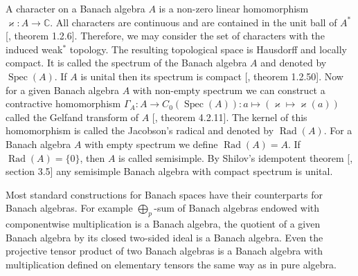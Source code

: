 A character on a Banach algebra $A$ is a non-zero linear homomorphism
$\varkappa:A\to\mathbb{C}$. All characters are continuous and are contained in
the unit ball of $A^*$  [\cite{HelBanLocConvAlg}, theorem 1.2.6]. Therefore, we
may consider the set of characters with the induced weak$^*$ topology. The
resulting topological space is Hausdorff and locally compact. It is called the
spectrum of the Banach algebra $A$ and denoted by $\operatorname{Spec}(A)$. If $A$
is unital then its spectrum is compact [\cite{HelBanLocConvAlg}, theorem
1.2.50]. Now for a given Banach algebra $A$ with non-empty spectrum we can
construct a contractive homomorphism $\Gamma_A:A\to
C_0(\operatorname{Spec}(A)):a\mapsto(\varkappa\mapsto \varkappa(a))$ called the
Gelfand transform of $A$ [\cite{HelBanLocConvAlg}, theorem 4.2.11]. The kernel
of this homomorphism is called the Jacobson's radical and denoted by
$\operatorname{Rad}(A)$. For a Banach algebra $A$ with empty spectrum we define
$\operatorname{Rad}(A)=A$. If $\operatorname{Rad}(A)= \{0 \}$, then $A$ is
called semisimple. By Shilov's idempotent theorem [\cite{KaniBanAlg}, section
3.5] any semisimple Banach algebra with compact spectrum is unital.

Most standard constructions for Banach spaces have their counterparts for
Banach algebras. For example $\bigoplus_p$-sum of Banach algebras endowed with
componentwise multiplication is a Banach algebra, the quotient of a given Banach
algebra by its closed two-sided ideal is a Banach algebra. Even the projective tensor
product of two Banach algebras is a Banach algebra with multiplication defined
on elementary tensors the same way as in pure algebra.

